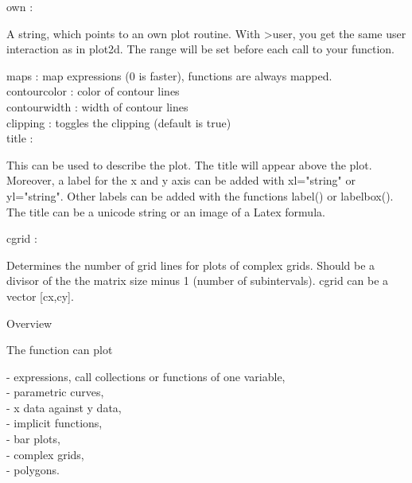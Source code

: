 \documentclass[a4paper,10pt]{article}
\begin{document}
\begin{eulernotebook}
\begin{eulercomment}
\begin{eulercomment}
\begin{eulercomment}
\begin{eulercomment}
\begin{eulercomment}
\begin{eulercomment}
\begin{eulercomment}
own       :\\
\end{eulercomment}
\begin{eulerttcomment}
  A string, which points to an own plot routine. With >user, you get
  the same user interaction as in plot2d. The range will be set
  before each call to your function.
\end{eulerttcomment}
\begin{eulercomment}
maps      : map expressions (0 is faster), functions are always mapped.\\
contourcolor : color of contour lines\\
contourwidth : width of contour lines\\
clipping  : toggles the clipping (default is true)\\
title     :\\
\end{eulercomment}
\begin{eulerttcomment}
  This can be used to describe the plot. The title will appear above
  the plot. Moreover, a label for the x and y axis can be added with
  xl="string" or yl="string". Other labels can be added with the
  functions label() or labelbox(). The title can be a unicode
  string or an image of a Latex formula.
\end{eulerttcomment}
\begin{eulercomment}
cgrid     :\\
\end{eulercomment}
\begin{eulerttcomment}
  Determines the number of grid lines for plots of complex grids.
  Should be a divisor of the the matrix size minus 1 (number of
  subintervals). cgrid can be a vector [cx,cy].
\end{eulerttcomment}
\begin{eulercomment}

Overview

The function can plot

- expressions, call collections or functions of one variable,\\
- parametric curves,\\
- x data against y data,\\
- implicit functions,\\
- bar plots,\\
- complex grids,\\
- polygons.


\end{eulercomment}
\end{eulercomment}
\end{eulercomment}
\end{eulercomment}
\end{eulercomment}
\end{eulercomment}
\end{eulercomment}
\end{eulernotebook}
\end{document}
